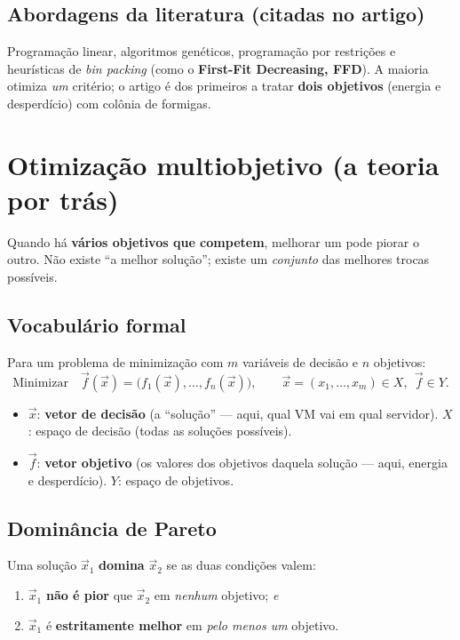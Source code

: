 \documentclass[11pt]{article}
\newcommand{\var}[1]{\textcolor{azul}{$#1$}}
\begin{document}
\subsection{Abordagens da literatura (citadas no artigo)}
Programação linear, algoritmos genéticos, programação por restrições e
heurísticas de \emph{bin packing} (como o \textbf{First-Fit Decreasing, FFD}).
A maioria otimiza \emph{um} critério; o artigo é dos primeiros a tratar
\textbf{dois objetivos} (energia e desperdício) com colônia de formigas.

\section{Otimização multiobjetivo (a teoria por trás)}
Quando há \textbf{vários objetivos que competem}, melhorar um pode piorar o
outro. Não existe ``a melhor solução''; existe um \emph{conjunto} das melhores
trocas possíveis.

\subsection{Vocabulário formal}
Para um problema de minimização com \var{m} variáveis de decisão e \var{n}
objetivos:
\[
\text{Minimizar}\quad \vec{f}(\vec{x}) = \big(f_1(\vec{x}),\dots,f_n(\vec{x})\big),
\qquad \vec{x}=(x_1,\dots,x_m)\in X,\ \ \vec{f}\in Y.
\]
\begin{itemize}[leftmargin=1.4em,itemsep=1pt]
  \item \var{\vec{x}}: \textbf{vetor de decisão} (a ``solução'' — aqui, qual VM
  vai em qual servidor). \var{X}: espaço de decisão (todas as soluções possíveis).
  \item \var{\vec{f}}: \textbf{vetor objetivo} (os valores dos objetivos daquela
  solução — aqui, energia e desperdício). \var{Y}: espaço de objetivos.
\end{itemize}

\subsection{Dominância de Pareto}
Uma solução \var{\vec{x}_1} \textbf{domina} \var{\vec{x}_2} se as duas condições
valem:
\begin{enumerate}[leftmargin=1.6em,itemsep=1pt]
  \item \var{\vec{x}_1} \textbf{não é pior} que \var{\vec{x}_2} em \emph{nenhum}
  objetivo; \emph{e}
  \item \var{\vec{x}_1} é \textbf{estritamente melhor} em \emph{pelo menos um}
  objetivo.
\end{enumerate}
\end{document}
